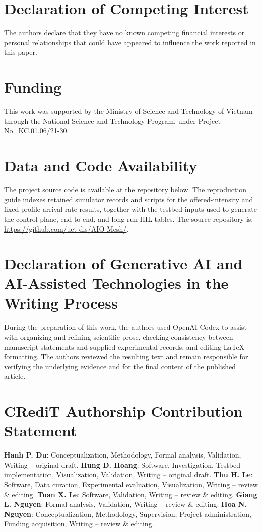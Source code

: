 \documentclass[final,5p]{elsarticle}
\newcommand{\rev}[1]{\textcolor{revisiongreen}{#1}}
\let\newrev\rev
\begin{document}
\section*{Declaration of Competing Interest}
The authors declare that they have no known competing financial interests or personal relationships that could have appeared to influence the work reported in this paper.

\section*{Funding} 
\noindent This work was supported by the Ministry of Science and Technology of Vietnam through the National Science and Technology Program, under Project No.~KC.01.06/21-30.

\section*{Data and Code Availability}
\newrev{The project source code is available at the repository below. The reproduction guide indexes retained simulator records and scripts for the offered-intensity and fixed-profile arrival-rate results, together with the testbed inputs used to generate the control-plane, end-to-end, and long-run HIL tables. The source repository is:}
\url{https://github.com/uet-dis/AIO-Mesh/}.

\section*{Declaration of Generative AI and AI-Assisted Technologies in the Writing Process}
During the preparation of this work, the authors used OpenAI Codex to assist with organizing and refining scientific prose, checking consistency between manuscript statements and supplied experimental records, and editing LaTeX formatting. The authors reviewed the resulting text and remain responsible for verifying the underlying evidence and for the final content of the published article.

\section*{CRediT Authorship Contribution Statement}
\textbf{Hanh P. Du}: Conceptualization, Methodology, Formal analysis, Validation, Writing -- original draft.
\textbf{Hung D. Hoang}: Software, Investigation, Testbed implementation, Visualization, Validation, Writing -- original draft.
\textbf{Thu H. Le}: Software, Data curation, Experimental evaluation, Visualization, Writing -- review \& editing.
\textbf{Tuan X. Le}: Software, Validation, Writing -- review \& editing.
\textbf{Giang L. Nguyen}: Formal analysis, Validation, Writing -- review \& editing.
\textbf{Hoa N. Nguyen}: Conceptualization, Methodology, Supervision, Project administration, Funding acquisition, Writing -- review \& editing.



\end{document}
